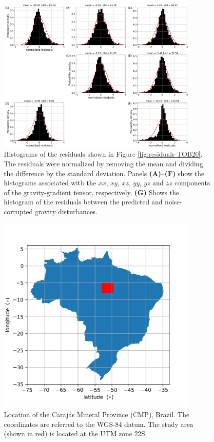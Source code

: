 \begin{figure}[htbp]
	\begin{center}
		\includegraphics[width=10cm]{Fig/TOB20_histograms}
	\end{center}
	\caption{
		Histograms of the residuals shown in Figure \ref{fig:residuals-TOB20}.
		The residuals were normalized by removing the mean and dividing the difference
		by the standard deviation.
		Panels \textbf{(A)}--\textbf{(F)} show the histograms associated with the 
		$xx$, $xy$, $xz$, $yy$, $yz$ and $zz$ components of the gravity-gradient tensor, respectively. 
		\textbf{(G)} Shows the histogram of the residuals between the predicted and noise-corrupted gravity disturbances.
	}
	\label{fig:histograms-TOB20}
\end{figure}


\begin{figure}[htbp]
	\begin{center}
		\includegraphics[width=10cm]{Fig/Brazil_map}
	\end{center}
	\caption{
		Location of the Caraj{\'a}s Mineral Province (CMP), Brazil. 
		The coordinates are referred to the WGS-84 datum. The study area (shown in red)
		is located at the UTM zone 22S.
	}
	\label{fig:carajas-location}
\end{figure}

